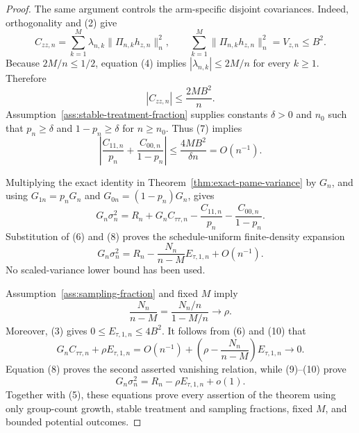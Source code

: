 \documentclass{article}
\begin{document}
\begin{proof}
The same argument controls the arm-specific disjoint covariances.  Indeed, orthogonality and (2) give
\[
C_{zz,n}
=\sum_{k=1}^M\lambda_{n,k}
  \|\Pi_{n,k}h_{z,n}\|_n^2,
\qquad
\sum_{k=1}^M\|\Pi_{n,k}h_{z,n}\|_n^2=V_{z,n}\leq B^2.
\]
Because \(2M/n\leq1/2\), equation (4) implies \(|\lambda_{n,k}|\leq2M/n\) for every \(k\geq1\).  Therefore
\[
|C_{zz,n}|\leq\frac{2MB^2}{n}.                              \tag{7}
\]
Assumption~\ref{ass:stable-treatment-fraction} supplies constants \(\delta>0\) and \(n_0\) such that \(p_n\geq\delta\) and \(1-p_n\geq\delta\) for \(n\geq n_0\).  Thus (7) implies
\[
\left|\frac{C_{11,n}}{p_n}+
       \frac{C_{00,n}}{1-p_n}\right|
\leq\frac{4MB^2}{\delta n}=O(n^{-1}).                      \tag{8}
\]

Multiplying the exact identity in Theorem~\ref{thm:exact-pame-variance} by \(G_n\), and using \(G_{1n}=p_nG_n\) and \(G_{0n}=(1-p_n)G_n\), gives
\[
G_n\sigma_n^2
=R_n+G_nC_{\tau\tau,n}
 -\frac{C_{11,n}}{p_n}-\frac{C_{00,n}}{1-p_n}.
\]
Substitution of (6) and (8) proves the schedule-uniform finite-density expansion
\[
G_n\sigma_n^2
=R_n-\frac{N_n}{n-M}E_{\tau,1,n}+O(n^{-1}).                \tag{9}
\]
No scaled-variance lower bound has been used.

Assumption~\ref{ass:sampling-fraction} and fixed \(M\) imply
\[
\frac{N_n}{n-M}
=\frac{N_n/n}{1-M/n}\longrightarrow\rho.                  \tag{10}
\]
Moreover, (3) gives \(0\leq E_{\tau,1,n}\leq4B^2\).  It follows from (6) and (10) that
\[
G_nC_{\tau\tau,n}+\rho E_{\tau,1,n}
=O(n^{-1})+
 \left(\rho-\frac{N_n}{n-M}\right)E_{\tau,1,n}
\longrightarrow0.                                         \tag{11}
\]
Equation (8) proves the second asserted vanishing relation, while (9)--(10) prove
\[
G_n\sigma_n^2=R_n-\rho E_{\tau,1,n}+o(1).
\]
Together with (5), these equations prove every assertion of the theorem using only group-count growth, stable treatment and sampling fractions, fixed \(M\), and bounded potential outcomes.


\end{proof}
\end{document}
